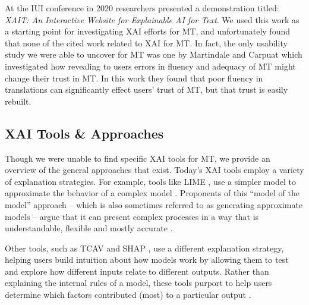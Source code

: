 At the IUI conference in 2020 researchers presented a demonstration titled: \textit{XAIT: An Interactive Website for Explainable AI for Text}. We used this work as a starting point for investigating XAI efforts for MT, and unfortunately found that none of the cited work related to XAI for MT\cite{oduor2020XAIT}. In fact, the only usability study we were able to uncover for MT was one by Martindale and Carpuat which investigated how revealing to users errors in fluency and adequacy of MT might change their trust in MT. In this work they found that poor fluency in translations can significantly effect users' trust of MT, but that trust is easily rebuilt\cite{martindaleFluency2018}.       

\subsection{XAI Tools \& Approaches}
Though we were unable to find specific XAI tools for MT, we provide an overview of the general approaches that exist. Today’s XAI tools employ a variety of explanation strategies. For example, tools like LIME \cite{RiberoLIME2016}, use a simpler model to approximate the behavior of a complex model \cite{SelbstBarocasIntuitive2018}. Proponents of this “model of the model” \cite{SelbstBarocasIntuitive2018} approach – which is also sometimes referred to as generating approximate models – argue that it can present complex processes in a way that is understandable, flexible and mostly accurate \cite{MittelstadtRussellExplain2019}. %

Other tools, such as TCAV \cite{KimTCAV2018} and SHAP \cite{LundbergLeeSHAP2017}, use a different explanation strategy, helping users build intuition about how models work by allowing them to test and explore how different inputs relate to different outputs. Rather than explaining the internal rules of a model, these tools purport to help users determine which factors contributed (most) to a particular output \cite{SelbstBarocasIntuitive2018}. %

